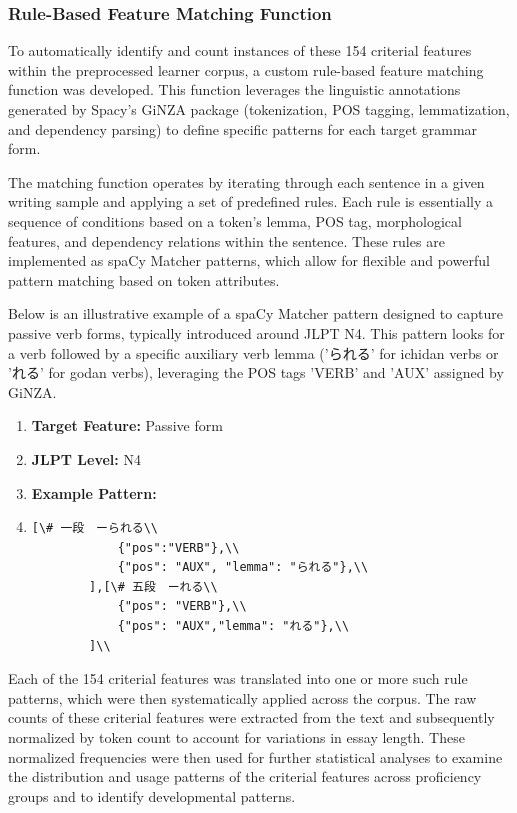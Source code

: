 \subsubsection{Rule-Based Feature Matching Function}

To automatically identify and count instances of these 154 criterial features within the preprocessed learner
corpus, a custom rule-based feature matching function was developed. This function leverages the linguistic
annotations generated by Spacy's GiNZA package (tokenization, POS tagging, lemmatization, and dependency parsing) to
define specific patterns for each target grammar form.

The matching function operates by iterating through each sentence in a given writing sample and applying a set of
predefined rules. Each rule is essentially a sequence of conditions based on a token's lemma, POS tag, morphological
features, and dependency relations within the sentence. These rules are implemented as spaCy Matcher patterns,
which allow for flexible and powerful pattern matching based on token attributes.

Below is an illustrative example of a spaCy Matcher pattern designed to capture passive verb forms, typically
introduced around JLPT N4. This pattern looks for a verb followed by a specific auxiliary verb lemma ('られる' for
ichidan verbs or 'れる' for godan verbs), leveraging the POS tags 'VERB' and 'AUX' assigned by GiNZA.

\begin{enumerate}
\item \textbf{Target Feature:} Passive form
\item \textbf{JLPT Level:} N4
\item \textbf{Example Pattern:}
\item[] 
\begin{lstlisting}
[\# 一段　ーられる\\
            {"pos":"VERB"},\\
            {"pos": "AUX", "lemma": "られる"},\\
        ],[\# 五段　ーれる\\
            {"pos": "VERB"},\\
            {"pos": "AUX","lemma": "れる"},\\
        ]\\
\end{lstlisting}
\end{enumerate}

Each of the 154 criterial features was translated into one or more such rule patterns, which were then
systematically applied across the corpus. The raw counts of these criterial
features were extracted from the text and subsequently normalized by token count to account for variations in
essay length. These normalized frequencies were then used for further statistical analyses to
examine the
distribution and usage patterns of the criterial features across proficiency groups and to identify developmental
patterns.


